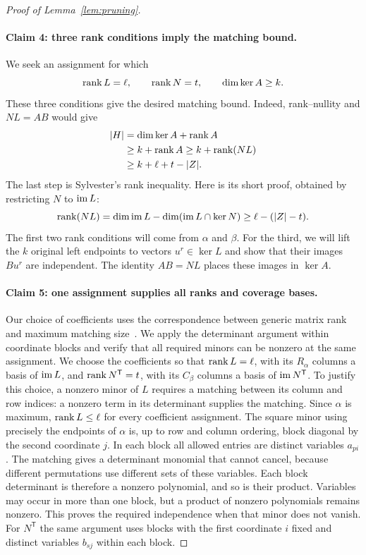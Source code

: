 \begin{proof}[Proof of Lemma~\ref{lem:pruning}]
\paragraph{Claim 4: three rank conditions imply the matching bound.}
We seek an assignment for which
\[
 \operatorname{rank} L=\ell,\qquad \operatorname{rank} N=t,\qquad \dim\ker A\geq k.
\]
These three conditions give the desired matching bound. Indeed,
rank--nullity and $NL=AB$ would give
\begin{align}
 \lvert H\rvert
 &=\dim\ker A+\operatorname{rank} A\notag\\
 &\geq k+\operatorname{rank} A
 \geq k+\operatorname{rank}(NL)\notag\\
 &\geq k+\ell+t-\lvert Z\rvert.
 \label{eq:pruning-rank-bound}
\end{align}
The last step is Sylvester's rank inequality. Here is its short proof, obtained by restricting $N$ to $\operatorname{im} L$:
\[
 \operatorname{rank}(NL)
 =\dim\operatorname{im} L-\dim(\operatorname{im} L\cap\ker N)
 \geq\ell-(\lvert Z\rvert-t).
\]
The first two rank conditions will come from $\alpha$ and $\beta$.
For the third, we will lift the $k$ original left endpoints to vectors
$u^r\in\ker L$ and show that their images $Bu^r$ are independent.
The identity $AB=NL$ places these images in $\ker A$.

\paragraph{Claim 5: one assignment supplies all ranks and coverage bases.}
Our choice of coefficients uses the correspondence between generic matrix
rank and maximum matching size~\cite[Section~5, Theorem~1]{Edmonds1967}.
We apply the determinant argument within coordinate blocks and verify that
all required minors can be nonzero at the same assignment.
We choose the coefficients so that $\operatorname{rank} L=\ell$, with its
$R_\alpha$ columns a basis of $\operatorname{im} L$, and
$\operatorname{rank} N^{\mathsf T}=t$, with its $C_\beta$ columns a basis of
$\operatorname{im} N^{\mathsf T}$.  To justify this choice, a nonzero minor of $L$
requires a matching between its column and row indices: a nonzero term
in its determinant supplies the matching.  Since $\alpha$ is maximum,
$\operatorname{rank} L\leq\ell$ for every coefficient assignment.  The square minor
using precisely the endpoints of $\alpha$ is, up to row and column
ordering, block diagonal by the second coordinate $j$.  In each block
all allowed entries are distinct variables $a_{pi}$.  The matching
gives a determinant monomial that cannot cancel, because different
permutations use different sets of these variables.  Each block
determinant is therefore a nonzero polynomial, and so is their product.
Variables may occur in more than one block, but a product of nonzero
polynomials remains nonzero.  This proves the required independence
when that minor does not vanish.  For $N^{\mathsf T}$ the same argument
uses blocks with the first coordinate $i$ fixed and distinct variables
$b_{sj}$ within each block.


\end{proof}
